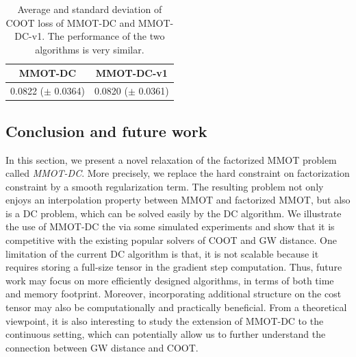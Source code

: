 \begin{table}[H]
  \label{tab:coot_new}
  \begin{center}
    \begin{small}
      \begin{sc}
        \begin{tabular}{|c|c|}
          \hline
          MMOT-DC & MMOT-DC-v1 \\
          \hline
          0.0822 ($\pm$ 0.0364) & 0.0820 ($\pm$ 0.0361) \\
          \hline
        \end{tabular}
      \end{sc}
    \end{small}
  \end{center}
  \caption{Average and standard deviation of COOT loss of MMOT-DC and MMOT-DC-v1. The performance of the two algorithms is
  very similar.}
\end{table}

\subsection{Conclusion and future work}

In this section, we present a novel relaxation of the factorized MMOT problem called \textit{MMOT-DC}.
More precisely, we replace the
hard constraint on factorization constraint by a smooth regularization term. The resulting problem
not only enjoys an interpolation property between MMOT and factorized MMOT, but also is a DC problem,
which can be solved easily by the DC algorithm. We illustrate the use of MMOT-DC the via some simulated experiments and show that
it is competitive with the existing popular solvers of COOT and GW distance.
One limitation of the current DC algorithm is that, it is not scalable because
it requires storing a full-size tensor in the gradient step computation. Thus, future
work may focus on more efficiently designed algorithms, in terms of both time and memory footprint.
Moreover, incorporating additional structure on the cost tensor may also be computationally and practically beneficial.
From a theoretical viewpoint, it is also interesting to study the extension of MMOT-DC to the continuous setting,
which can potentially allow us to further understand the connection between GW distance and COOT.


